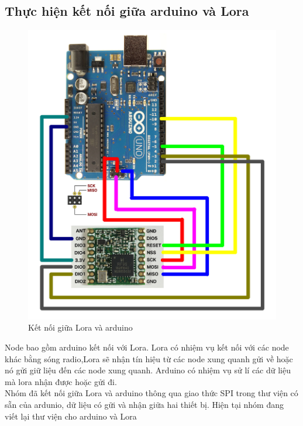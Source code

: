 \subsection{Thực hiện kết nối giữa arduino và Lora}
\begin{center}
    \begin{figure}[htp]
    \begin{center}
     \includegraphics[scale=.2]{image6/loraar.jpg}
    \end{center}
    \caption{Kết nối giữa Lora và arduino}
    \label{refhinh1}
    \end{figure}
\end{center}
Node bao gồm arduino kết nối với Lora. Lora có nhiệm vụ kết nối với các node khác bằng sóng radio,Lora sẽ nhận tín hiệu từ các node xung quanh gửi về hoặc nó gửi giữ liệu đến các node xung quanh. Arduino có nhiệm vụ sử lí các dữ liệu mà lora nhận được hoặc gửi đi.\\
Nhóm đã kết nối giữa Lora và arduino thông qua giao thức SPI trong thư viện có sẵn của ardunio, dữ liệu có gữi và nhận giữa hai thiết bị. Hiện tại nhóm đang viết lại thư viện cho arduino và Lora
